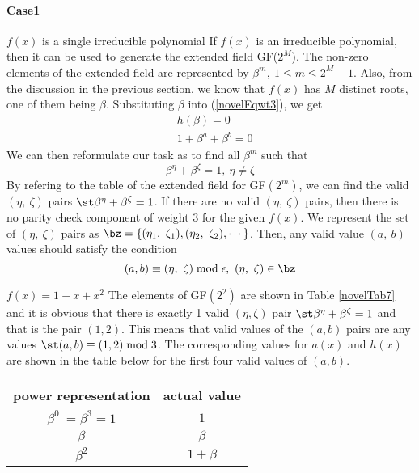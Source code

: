 \paragraph{ Case1} $f(x)$ is a single irreducible polynomial \newline
If $f(x)$ is an irreducible polynomial, then it can be used to generate the extended field GF($2^M$). The non-zero elements of the extended field are represented by $\beta^m,~1 \leq m \leq 2^M-1$. Also, from the discussion in the previous section, we know that $f(x)$ has $M$ distinct roots, one of them being $\beta$. Substituting $\beta$ into (\ref{novelEqwt3}), we get 
\begin{equation}
\begin{split}
&h(\beta)=0\\
&1+\beta^a+\beta^b=0
\end{split}
\label{novelEqwt3-1}
\end{equation}
We can then reformulate our task as to find all $\beta^m$ such that 
\begin{equation}
\beta^{\eta}+\beta^{\zeta}=1,~\eta \neq \zeta
\end{equation}
By refering to the table of the extended field for GF$(2^m)$, we can find the valid $(\eta,~\zeta)$ pairs $\st \beta^{\eta}+\beta^{\zeta}=1$. If there are no valid $(\eta,~\zeta)$ pairs, then there is no parity check component of weight $3$ for the given $f(x)$.
 We represent the set of $(\eta,~\zeta)$ pairs as 
$\bz=\{ (\eta_1,~\zeta_1) ,( \eta_2,~\zeta_2),\cdots\}$. Then, any valid value $(a,~b)$ values should satisfy the condition
\begin{equation}
(a,b) \equiv (\eta,~\zeta) \bmod \epsilon,~(\eta,~\zeta)\in \bz
\end{equation}
\begin{example}
$f(x)=1+x+x^2$ \newline
The elements of GF$(2^2)$ are shown in Table \ref{novelTab7} and it is obvious that there is exactly 1 valid $(\eta,\zeta)$ pair $\st \beta^{\eta}+\beta^{\zeta} = 1$ and that is the pair $(1,2)$.
This means that valid values of the $(a,b)$ pairs are any values $\st (a,b) \equiv (1,2) \bmod 3$.  The corresponding values for $a(x)$ and $h(x)$ are shown in the table below for the first four valid values of $(a,b)$.
\end{example}

 \begin{table*}[h!]
 \caption{Non-zero Elements of GF$(2^2)$ generated by $f(x)=1+x+x^2$}
\centering
 \begin{tabular}{c c} 
 \hline
 power representation & actual value \\ [0.5ex] 
 \hline\hline
$\beta^0~=\beta^3=1$ & $1$\\
\hline
$\beta$ & $\beta$\\
\hline
$\beta^2$ &  $1+\beta$\\
\hline
 \end{tabular}
 \label{novelTab7}
\end{table*}

